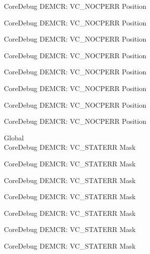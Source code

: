 \begin{DoxyRefList}
\label{deprecated__deprecated000516}%
%
Core\+Debug DEMCR\+: VC\+\_\+\+NOCPERR Position 

\label{deprecated__deprecated000618}%
%
Core\+Debug DEMCR\+: VC\+\_\+\+NOCPERR Position 

\label{deprecated__deprecated000743}%
%
Core\+Debug DEMCR\+: VC\+\_\+\+NOCPERR Position 

\label{deprecated__deprecated000887}%
%
Core\+Debug DEMCR\+: VC\+\_\+\+NOCPERR Position 

\label{deprecated__deprecated001029}%
%
Core\+Debug DEMCR\+: VC\+\_\+\+NOCPERR Position 

\label{deprecated__deprecated001105}%
%
Core\+Debug DEMCR\+: VC\+\_\+\+NOCPERR Position 

\label{deprecated__deprecated001194}%
%
Core\+Debug DEMCR\+: VC\+\_\+\+NOCPERR Position 

\label{deprecated__deprecated001296}%
%
Core\+Debug DEMCR\+: VC\+\_\+\+NOCPERR Position  
\item[Global \doxylink{group___c_m_s_i_s___core_debug_gaa38b947d77672c48bba1280c0a642e19}{Core\+Debug\+\_\+\+DEMCR\+\_\+\+VC\+\_\+\+STATERR\+\_\+\+Msk} ]\hfill \\
\label{deprecated__deprecated000062}%
%
Core\+Debug DEMCR\+: VC\+\_\+\+STATERR Mask 

\label{deprecated__deprecated000206}%
%
Core\+Debug DEMCR\+: VC\+\_\+\+STATERR Mask 

\label{deprecated__deprecated000348}%
%
Core\+Debug DEMCR\+: VC\+\_\+\+STATERR Mask 

\label{deprecated__deprecated000424}%
%
Core\+Debug DEMCR\+: VC\+\_\+\+STATERR Mask 

\label{deprecated__deprecated000513}%
%
Core\+Debug DEMCR\+: VC\+\_\+\+STATERR Mask 

\label{deprecated__deprecated000615}%
%
Core\+Debug DEMCR\+: VC\+\_\+\+STATERR Mask 

\label{deprecated__deprecated000740}%
%
Core\+Debug DEMCR\+: VC\+\_\+\+STATERR Mask 


\end{DoxyRefList}
